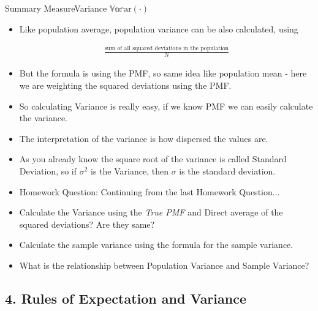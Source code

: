 \documentclass[8pt, usepdftitle = false]{beamer}
\begin{document}
\begin{frame}[allowframebreaks]{Summary Measure}{Variance $\mathbb{Var}\mathrm{ar}(\cdot)$}
\begin{itemize}
\item Like population average, population variance can be also calculated, using

\begin{align*}
	\frac{\text{sum of all squared deviations in the population}}{N}
\end{align*}

\item But the formula is using the PMF, so same idea like population mean - here we are weighting the squared deviations using the PMF. 


\framebreak

\item So calculating Variance is really easy, if we know PMF we can easily calculate the variance. 

\item The interpretation of the variance is how dispersed the values are.


\item As you already know the square root of the variance is called \alert{Standard Deviation}, so if $\sigma^2$ is the Variance, then $\sigma$ is the standard deviation.


\framebreak


\item \alert{Homework Question:} Continuing from the last Homework Question...

\item Calculate the Variance using the \emph{True PMF} and Direct average of the squared deviations? Are they same?

\item Calculate the sample variance using the formula for the sample variance.

\item What is the relationship between Population Variance and Sample Variance?



\end{itemize}

\end{frame}



\subsection{4. Rules of Expectation and Variance}
\frame{\subsectionpage}
\end{document}
